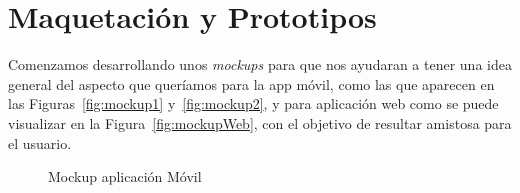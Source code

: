 \section{Maquetación y Prototipos}
Comenzamos desarrollando unos \textit{mockups} para que nos ayudaran a tener una idea general del aspecto que queríamos para la app móvil, como las que aparecen en las Figuras~\ref{fig:mockup1} y~\ref{fig:mockup2}, y para aplicación web como se puede visualizar en la Figura~\ref{fig:mockupWeb}, con el objetivo de resultar amistosa para el usuario.


\begin{figure}[h]
 \centering
    \hfill
 \caption{Mockup aplicación Móvil}
\label{fig:mockupAppMovil}
\end{figure}

